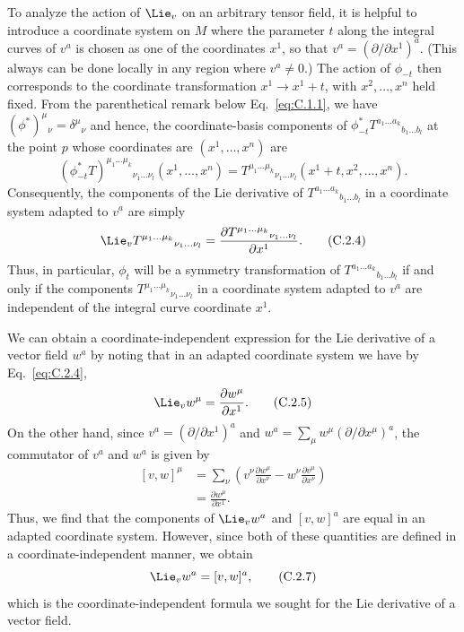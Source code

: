 To analyze the action of \(\Lie_v\) on an arbitrary tensor field, it is helpful to
introduce a coordinate system on \(M\) where the parameter \(t\) along the integral
curves of \(v^a\) is chosen as one of the coordinates \(x^1\), so that
\(v^a=(\partial/\partial x^1)^a\). (This always can be done locally in any region
where \(v^a\ne0\).) The action of \(\phi_{-t}\) then corresponds to the coordinate
transformation \(x^1\to x^1+t\), with \(x^2,\ldots,x^n\) held fixed. From the
parenthetical remark below Eq.~\eqref{eq:C.1.1}, we have
\((\phi^*)^\mu{}_\nu=\delta^\mu{}_\nu\) and hence, the coordinate-basis components
of \(\phi_{-t}^*T^{a_1\ldots a_k}{}_{b_1\ldots b_l}\) at the point \(p\) whose
coordinates are \((x^1,\ldots,x^n)\) are
\begin{equation}
  (\phi_{-t}^*T)^{\mu_1\ldots\mu_k}{}_{\nu_1\ldots\nu_l}
  (x^1,\ldots,x^n)
  =T^{\mu_1\ldots\mu_k}{}_{\nu_1\ldots\nu_l}
  (x^1+t,x^2,\ldots,x^n).
  \tag{C.2.3}\label{eq:C.2.3}
\end{equation}
Consequently, the components of the Lie derivative of
\(T^{a_1\ldots a_k}{}_{b_1\ldots b_l}\) in a coordinate system adapted to \(v^a\)
are simply
\begin{equation}
  \Lie_vT^{\mu_1\ldots\mu_k}{}_{\nu_1\ldots\nu_l}
  =\frac{\partial T^{\mu_1\ldots\mu_k}{}_{\nu_1\ldots\nu_l}}{\partial x^1}.
  \tag{C.2.4}\label{eq:C.2.4}
\end{equation}
Thus, in particular, \(\phi_t\) will be a symmetry transformation of
\(T^{a_1\ldots a_k}{}_{b_1\ldots b_l}\) if and only if the components
\(T^{\mu_1\ldots\mu_k}{}_{\nu_1\ldots\nu_l}\) in a coordinate system adapted to
\(v^a\) are independent of the integral curve coordinate \(x^1\).

We can obtain a coordinate-independent expression for the Lie derivative of a vector
field \(w^a\) by noting that in an adapted coordinate system we have by
Eq.~\eqref{eq:C.2.4},
\begin{equation}
  \Lie_vw^\mu=\frac{\partial w^\mu}{\partial x^1}.
  \tag{C.2.5}\label{eq:C.2.5}
\end{equation}
On the other hand, since \(v^a=(\partial/\partial x^1)^a\) and
\(w^a=\sum_\mu w^\mu(\partial/\partial x^\mu)^a\), the commutator of \(v^a\) and
\(w^a\) is given by
\begin{equation}
\begin{aligned}
  [v,w]^\mu
  &=\sum_\nu\left(
    v^\nu\frac{\partial w^\mu}{\partial x^\nu}
    -w^\nu\frac{\partial v^\mu}{\partial x^\nu}
  \right) \\
  &=\frac{\partial w^\mu}{\partial x^1}.
\end{aligned}
  \tag{C.2.6}\label{eq:C.2.6}
\end{equation}
Thus, we find that the components of \(\Lie_vw^a\) and \([v,w]^a\) are equal in an
adapted coordinate system. However, since both of these quantities are defined in a
coordinate-independent manner, we obtain
\begin{equation}
  \Lie_vw^a=[v,w]^a,
  \tag{C.2.7}\label{eq:C.2.7}
\end{equation}
which is the coordinate-independent formula we sought for the Lie derivative of a
vector field.

